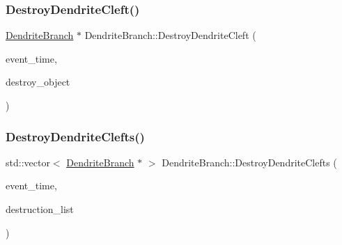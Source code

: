\mbox{\label{classDendriteBranch_a60225ab106eae6bce25eb8159166d5e9}} 
\subsubsection{\texorpdfstring{Destroy\+Dendrite\+Cleft()}{DestroyDendriteCleft()}}
{\footnotesize\ttfamily \mbox{\hyperlink{classDendriteBranch}{Dendrite\+Branch}} $\ast$ Dendrite\+Branch\+::\+Destroy\+Dendrite\+Cleft (\begin{DoxyParamCaption}\item[{std\+::chrono\+::time\+\_\+point$<$ \mbox{\hyperlink{universe_8h_a0ef8d951d1ca5ab3cfaf7ab4c7a6fd80}{Clock}} $>$}]{event\+\_\+time,  }\item[{\mbox{\hyperlink{classDendriteBranch}{Dendrite\+Branch}} $\ast$}]{destroy\+\_\+object }\end{DoxyParamCaption})}

\mbox{\label{classDendriteBranch_a454dd0483439353076df63fc124a24f7}} 
\subsubsection{\texorpdfstring{Destroy\+Dendrite\+Clefts()}{DestroyDendriteClefts()}}
{\footnotesize\ttfamily std\+::vector$<$ \mbox{\hyperlink{classDendriteBranch}{Dendrite\+Branch}} $\ast$ $>$ Dendrite\+Branch\+::\+Destroy\+Dendrite\+Clefts (\begin{DoxyParamCaption}\item[{std\+::chrono\+::time\+\_\+point$<$ \mbox{\hyperlink{universe_8h_a0ef8d951d1ca5ab3cfaf7ab4c7a6fd80}{Clock}} $>$}]{event\+\_\+time,  }\item[{std\+::vector$<$ \mbox{\hyperlink{classDendriteBranch}{Dendrite\+Branch}} $\ast$$>$}]{destruction\+\_\+list }\end{DoxyParamCaption})}

\mbox{\label{classDendriteBranch_a4d4a4b1591dd612eef903d95605d50fd}} 
